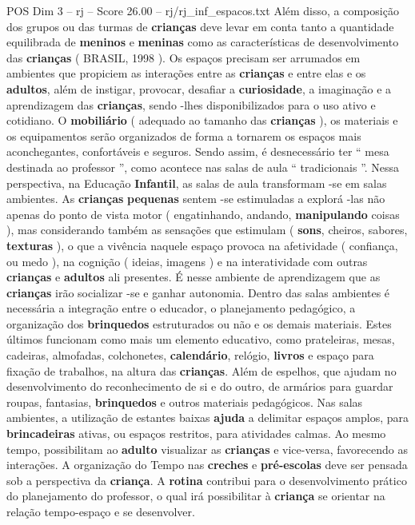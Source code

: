 \begin{textsample}{POS Dim 3 – rj – Score 26.00 – rj/rj\_inf\_espacos.txt}
Além disso, a composição dos grupos ou das turmas de \textbf{crianças} deve levar em conta tanto a quantidade equilibrada de \textbf{meninos} e \textbf{meninas} como as características de desenvolvimento das \textbf{crianças} ( BRASIL, 1998 ).
Os espaços precisam ser arrumados em ambientes que propiciem as interações entre as \textbf{crianças} e entre elas e os \textbf{adultos}, além de instigar, provocar, desafiar a \textbf{curiosidade}, a imaginação e a aprendizagem das \textbf{crianças}, sendo -lhes disponibilizados para o uso ativo e cotidiano.
O \textbf{mobiliário} ( adequado ao tamanho das \textbf{crianças} ), os materiais e os equipamentos serão organizados de forma a tornarem os espaços mais aconchegantes, confortáveis e seguros.
Sendo assim, é desnecessário ter “ mesa destinada ao professor ”, como acontece nas salas de aula “ tradicionais ”.
Nessa perspectiva, na Educação \textbf{Infantil}, as salas de aula transformam -se em salas ambientes.
As \textbf{crianças} \textbf{pequenas} sentem -se estimuladas a explorá -las não apenas do ponto de vista motor ( engatinhando, andando, \textbf{manipulando} coisas ), mas considerando também as sensações que estimulam ( \textbf{sons}, cheiros, sabores, \textbf{texturas} ), o que a vivência naquele espaço provoca na afetividade ( confiança, ou medo ), na cognição ( ideias, imagens ) e na interatividade com outras \textbf{crianças} e \textbf{adultos} ali presentes.
É nesse ambiente de aprendizagem que as \textbf{crianças} irão socializar -se e ganhar autonomia.
Dentro das salas ambientes é necessária a integração entre o educador, o planejamento pedagógico, a organização dos \textbf{brinquedos} estruturados ou não e os demais materiais.
Estes últimos funcionam como mais um elemento educativo, como prateleiras, mesas, cadeiras, almofadas, colchonetes, \textbf{calendário}, relógio, \textbf{livros} e espaço para fixação de trabalhos, na altura das \textbf{crianças}.
Além de espelhos, que ajudam no desenvolvimento do reconhecimento de si e do outro, de armários para guardar roupas, fantasias, \textbf{brinquedos} e outros materiais pedagógicos.
Nas salas ambientes, a utilização de estantes baixas \textbf{ajuda} a delimitar espaços amplos, para \textbf{brincadeiras} ativas, ou espaços restritos, para atividades calmas.
Ao mesmo tempo, possibilitam ao \textbf{adulto} visualizar as \textbf{crianças} e vice-versa, favorecendo as interações.
A organização do Tempo nas \textbf{creches} e \textbf{pré-escolas} deve ser pensada sob a perspectiva da \textbf{criança}.
A \textbf{rotina} contribui para o desenvolvimento prático do planejamento do professor, o qual irá possibilitar à \textbf{criança} se orientar na relação tempo-espaço e se desenvolver.

\end{textsample}
